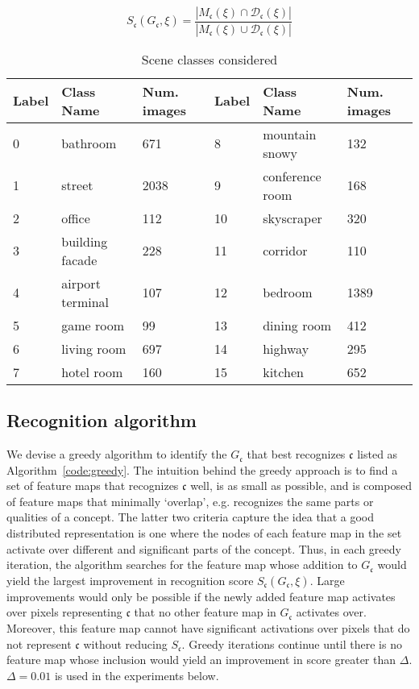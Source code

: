 \documentclass{article}
\begin{document}
$$S_\mathfrak{c}(G_\mathfrak{c},\xi) = \frac{| M_\mathfrak{c}(\xi) \cap \mathcal{D}_{\mathfrak{c}}(\xi) |}{| M_\mathfrak{c}(\xi) \cup \mathcal{D}_{\mathfrak{c}}(\xi) |}$$

\begin{table}[t]
  \caption{Scene classes considered}
  \label{table:sceneclass}
  \centering
  \begin{tabular}{llllll}
    \toprule
    \textbf{Label}  & \textbf{Class Name}  & \textbf{Num. images} & \textbf{Label} & \textbf{Class Name} & \textbf{Num. images} \\
    \midrule
    0 & bathroom      & 671     &  8  & mountain snowy  & 132\\
    1 & street          & 2038  & 9   & conference room   & 168\\
    2 & office            & 112     & 10 & skyscraper       & 320\\
    3 & building facade   & 228     & 11 & corridor       & 110\\ 
    4 & airport terminal & 107    & 12 & bedroom        & 1389\\
    5 & game room     & 99    & 13 & dining room      & 412\\
    6 & living room     & 697     & 14 & highway        & 295 \\
    7 & hotel room    & 160     & 15 & kitchen          & 652\\
    \bottomrule
  \end{tabular}
\end{table}

\subsection{Recognition algorithm}
\label{subsub:greedy}
We devise a greedy algorithm to identify the $G_\mathfrak{c}$ that best 
recognizes $\mathfrak{c}$ listed as Algorithm~\ref{code:greedy}. 
The intuition behind the greedy 
approach is to find a set of feature maps that recognizes $\mathfrak{c}$ well, is as small
as possible, and is composed of feature maps that minimally `overlap', e.g. recognizes the same parts or qualities
of a concept. The latter two criteria capture the idea that a good 
distributed representation is one where the nodes of each feature map in the set 
activate over different and significant parts of the concept. Thus, in each greedy iteration, 
the algorithm searches for the feature map whose addition to $G_\mathfrak{c}$ would yield the largest improvement
in recognition score $S_\mathfrak{c}(G_\mathfrak{c},\xi)$. Large improvements would only be possible if the newly added
feature map activates over pixels representing $\mathfrak{c}$ that no other feature map in $G_\mathfrak{c}$
activates over. Moreover, this feature map cannot have significant activations over pixels that do not
represent $\mathfrak{c}$ without reducing $S_\mathfrak{c}$. Greedy iterations continue until there is no feature map whose inclusion would yield
an improvement in score greater than $\Delta$. $\Delta=0.01$ is used in the experiments below.
\end{document}
